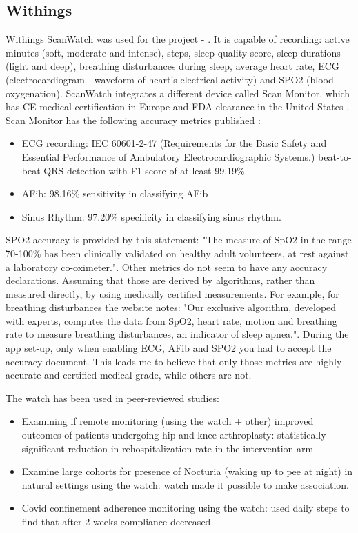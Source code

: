 \subsection{Withings}
\label{section:WithingsWatch}
Withings ScanWatch was used for the project - \cite{withingsStorePage}. It is capable of recording: active minutes (soft, moderate and intense), steps, sleep quality score, sleep durations (light and deep), breathing disturbances during sleep, average heart rate, ECG (electrocardiogram - waveform of heart's electrical activity) and SPO2 (blood oxygenation). ScanWatch integrates a different device called Scan Monitor, which has CE medical certification in Europe and FDA clearance in the United States \cite{withingsStorePage}.  Scan Monitor has the following accuracy metrics published \cite{scanMonitor}:
\begin{itemize}
    \item ECG recording: IEC 60601-2-47 (Requirements for the Basic Safety and Essential Performance of Ambulatory Electrocardiographic Systems.) beat-to-beat QRS detection with F1-score of at least 99.19\% 
    \item AFib: 98.16\% sensitivity in classifying AFib
    \item Sinus Rhythm: 97.20\% specificity in classifying sinus rhythm.
\end{itemize}
SPO2 accuracy is provided by this statement: "The measure of SpO2 in the range 70-100\% has been clinically validated on healthy adult volunteers, at rest against a laboratory co-oximeter.". \cite{scanMonitor}
Other metrics do not seem to have any accuracy declarations. Assuming that those are derived by algorithms, rather than measured directly, by using medically certified measurements. For example, for breathing disturbances the website notes: "Our exclusive algorithm, developed with experts, computes the data from SpO2, heart rate, motion and breathing rate to measure breathing disturbances, an indicator of sleep apnea.". During the app set-up, only when enabling ECG, AFib and SPO2 you had to accept the accuracy document. This leads me to believe that only those metrics are highly accurate and certified medical-grade, while others are not.

The watch has been used in peer-reviewed studies:
\begin{itemize}
    \item Examining if remote monitoring (using the watch + other) improved outcomes of patients undergoing hip and knee arthroplasty: statistically significant reduction in rehospitalization rate in the intervention arm \cite{withingsHospitalization}
    \item Examine large cohorts for presence of Nocturia (waking up to pee at night) in natural settings using the watch: watch made it possible to make association. \cite{withingsNocturia}
    \item Covid confinement adherence monitoring using the watch: used daily steps to find that after 2 weeks compliance decreased. \cite{withingsCovidConfinement}
\end{itemize}


